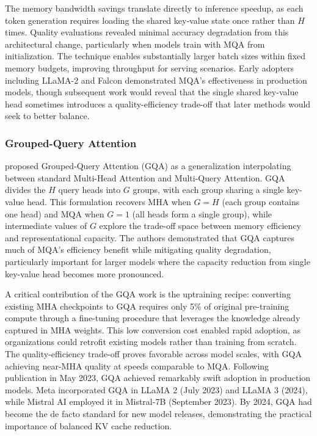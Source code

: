 \documentclass[11pt,letterpaper]{article}
\begin{document}
The memory bandwidth savings translate directly to inference speedup, as each token generation requires loading the shared key-value state once rather than $H$ times. Quality evaluations revealed minimal accuracy degradation from this architectural change, particularly when models train with MQA from initialization. The technique enables substantially larger batch sizes within fixed memory budgets, improving throughput for serving scenarios. Early adopters including LLaMA-2 and Falcon demonstrated MQA's effectiveness in production models, though subsequent work would reveal that the single shared key-value head sometimes introduces a quality-efficiency trade-off that later methods would seek to better balance.

\subsubsection{Grouped-Query Attention}

\cite{ainslie2023gqa} proposed Grouped-Query Attention (GQA) as a generalization interpolating between standard Multi-Head Attention and Multi-Query Attention. GQA divides the $H$ query heads into $G$ groups, with each group sharing a single key-value head. This formulation recovers MHA when $G = H$ (each group contains one head) and MQA when $G = 1$ (all heads form a single group), while intermediate values of $G$ explore the trade-off space between memory efficiency and representational capacity. The authors demonstrated that GQA captures much of MQA's efficiency benefit while mitigating quality degradation, particularly important for larger models where the capacity reduction from single key-value head becomes more pronounced.

A critical contribution of the GQA work is the uptraining recipe: converting existing MHA checkpoints to GQA requires only 5\% of original pre-training compute through a fine-tuning procedure that leverages the knowledge already captured in MHA weights. This low conversion cost enabled rapid adoption, as organizations could retrofit existing models rather than training from scratch. The quality-efficiency trade-off proves favorable across model scales, with GQA achieving near-MHA quality at speeds comparable to MQA. Following publication in May 2023, GQA achieved remarkably swift adoption in production models. Meta incorporated GQA in LLaMA 2 (July 2023) and LLaMA 3 (2024), while Mistral AI employed it in Mistral-7B (September 2023). By 2024, GQA had become the de facto standard for new model releases, demonstrating the practical importance of balanced KV cache reduction.
\end{document}

